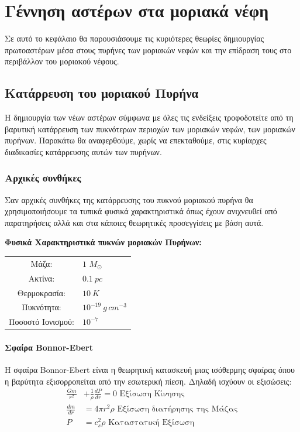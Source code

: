 \documentclass[a4paper,12pt]{memoir}
\newcommand{\sm}{$M_{\odot}$}
\begin{document}
\chapter{Γέννηση αστέρων στα μοριακά νέφη}
Σε αυτό το κεφάλαιο θα παρουσιάσουμε τις κυριότερες θεωρίες δημιουργίας πρωτοαστέρων μέσα στους πυρήνες των μοριακών νεφών και την επίδραση τους στο περιβάλλον του μοριακού νέφους.

\section{Κατάρρευση του μοριακού Πυρήνα}
Η δημιουργία των νέων αστέρων σύμφωνα με όλες τις ενδείξεις τροφοδοτείτε από τη βαρυτική κατάρρευση των πυκνότερων περιοχών των μοριακών νεφών, των μοριακών πυρήνων. Παρακάτω θα αναφερθούμε, χωρίς να επεκταθούμε, στις κυρίαρχες διαδικασίες κατάρρευσης αυτών των πυρήνων.

\subsection{Αρχικές συνθήκες}
Σαν αρχικές συνθήκες της κατάρρευσης του πυκνού μοριακού πυρήνα θα χρησιμοποιήσουμε τα τυπικά φυσικά χαρακτηριστικά όπως έχουν ανιχνευθεί από παρατηρήσεις αλλά και στα κάποιες θεωρητικές προσεγγίσεις με βάση αυτά.

\textbf{Φυσικά Χαρακτηριστικά πυκνών μοριακών Πυρήνων:}

\begin{tabular}{|c l}
	Μάζα: & $1$ \sm \\
	Ακτίνα: & $0.1 \ pc$ \\
	Θερμοκρασία: & $10 \ K$ \\
	Πυκνότητα: & $10^{-19} \ g \, cm^{-3}$ \\
	Ποσοστό Ιονισμού: & $10^{-7}$ 
\end{tabular}

\subsubsection{Σφαίρα Bonnor-Ebert}
Η σφαίρα Bonnor-Ebert είναι η θεωρητική κατασκευή μιας ισόθερμης σφαίρας όπου η βαρύτητα εξισορροπείται από την εσωτερική πίεση. Δηλαδή ισχύουν οι εξισώσεις:
\begin{align}
\frac{Gm}{r^2} &+\frac{1}{\rho}\frac{dP}{dr}=0 \text{ Εξίσωση Κίνησης}\\
\frac{dm}{dr} &= 4 \pi r^2 \rho \text{ Εξίσωση διατήρησης της Μάζας}\\
P &= c_s ^2 \rho \text{ Καταστατική Εξίσωση}
\end{align}
\end{document}
